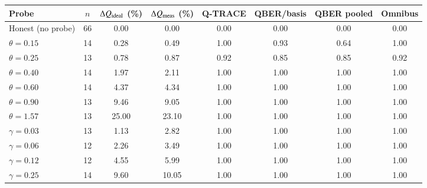 \begin{tabular}{lccccccc}
\toprule
Probe & $n$ & $\Delta Q_{\rm ideal}$ (\%) & $\Delta Q_{\rm meas}$ (\%) & Q-TRACE & QBER/basis & QBER pooled & Omnibus \\
\midrule
Honest (no probe) & 66 & 0.00 & 0.00 & 0.00 & 0.00 & 0.00 & 0.00 \\
\midrule
$\theta=0.15$ & 14 & 0.28 & 0.49 & 1.00 & 0.93 & 0.64 & 1.00 \\
$\theta=0.25$ & 13 & 0.78 & 0.87 & 0.92 & 0.85 & 0.85 & 0.92 \\
$\theta=0.40$ & 14 & 1.97 & 2.11 & 1.00 & 1.00 & 1.00 & 1.00 \\
$\theta=0.60$ & 14 & 4.37 & 4.34 & 1.00 & 1.00 & 1.00 & 1.00 \\
$\theta=0.90$ & 13 & 9.46 & 9.05 & 1.00 & 1.00 & 1.00 & 1.00 \\
$\theta=1.57$ & 13 & 25.00 & 23.10 & 1.00 & 1.00 & 1.00 & 1.00 \\
\midrule
$\gamma=0.03$ & 13 & 1.13 & 2.82 & 1.00 & 1.00 & 1.00 & 1.00 \\
$\gamma=0.06$ & 12 & 2.26 & 3.49 & 1.00 & 1.00 & 1.00 & 1.00 \\
$\gamma=0.12$ & 12 & 4.55 & 5.99 & 1.00 & 1.00 & 1.00 & 1.00 \\
$\gamma=0.25$ & 14 & 9.60 & 10.05 & 1.00 & 1.00 & 1.00 & 1.00 \\
\bottomrule
\end{tabular}

